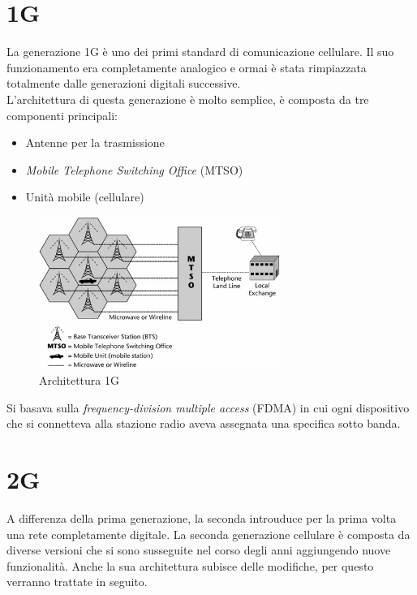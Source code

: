 \section{1G}
La generazione 1G è uno dei primi standard di comunicazione cellulare. Il suo funzionamento era completamente analogico 
e ormai è stata rimpiazzata totalmente dalle generazioni digitali successive.\\
L'architettura di questa generazione è molto semplice, è composta da tre componenti principali:
\begin{itemize}
    \item Antenne per la trasmissione
    \item \textit{Mobile Telephone Switching Office} (MTSO)
    \item Unità mobile (cellulare)
\end{itemize}
\begin{figure}[ht]
    \centering
    \includegraphics[width=0.7\textwidth]{images/1g.jpg}
    \caption{Architettura 1G}
\end{figure}
Si basava sulla \textit{frequency-division multiple access} (FDMA) in cui ogni dispositivo che si connetteva alla stazione radio
aveva assegnata una specifica sotto banda\cite{generations}.

\clearpage

\section{2G}
A differenza della prima generazione, la seconda introuduce per la prima volta una rete completamente digitale.
La seconda generazione cellulare è composta da diverse versioni che si sono susseguite nel corso degli anni aggiungendo nuove 
funzionalità.
Anche la sua architettura subisce delle modifiche, per questo verranno trattate in seguito.
